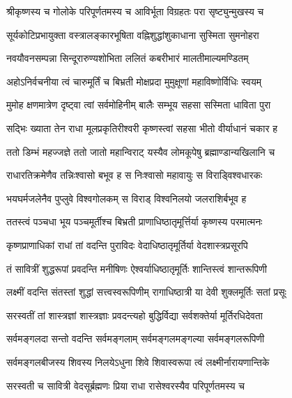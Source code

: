 

\twolineshloka
{श्रीकृष्णस्य च गोलोके परिपूर्णतमस्य च}
{आविर्भूता विग्रहतः परा सृष्ट्युन्मुखस्य च}

\twolineshloka
{सूर्यकोटिप्रभायुक्ता वस्त्रालङ्कारभूषिता}
{वह्निशुद्धांशुकाधाना सुस्मिता सुमनोहरा}

\twolineshloka
{नवयौवनसम्पन्ना सिन्दूरारुण्यशोभिता}
{ललितं कबरीभारं मालतीमाल्यमण्डितम्}

\twolineshloka
{अहोऽनिर्वचनीया त्वं चारुमूर्तिं च बिभ्रती}
{मोक्षप्रदा मुमुक्षूणां महाविष्णोर्विधिः स्वयम्}

\twolineshloka
{मुमोह क्षणमात्रेण दृष्ट्वा त्वां सर्वमोहिनीम्}
{बालैः सम्भूय सहसा सस्मिता धाविता पुरा}

\twolineshloka
{सद्भिः ख्याता तेन राधा मूलप्रकृतिरीश्वरी}
{कृष्णस्त्वां सहसा भीतो वीर्याधानं चकार ह}

\twolineshloka
{ततो डिम्भं महज्जज्ञे ततो जातो महान्विराट्}
{यस्यैव लोमकूपेषु ब्रह्माण्डान्यखिलानि च}

\twolineshloka
{राधारतिक्रमेणैव तन्निःश्वासो बभूव ह}
{स निःश्वासो महावायुः स विराड्\mbox{}विश्वधारकः}

\twolineshloka
{भयघर्मजलेनैव पुप्लुवे विश्वगोलकम्}
{स विराड् विश्वनिलयो जलराशिर्बभूव ह}

\twolineshloka
{ततस्त्वं पञ्चधा भूय पञ्चमूर्तीश्च बिभ्रती}
{प्राणाधिष्ठातृमूर्त्तिर्या कृष्णस्य परमात्मनः}

\twolineshloka
{कृष्णप्राणाधिकां राधां तां वदन्ति पुराविदः}
{वेदाधिष्ठातृमूर्तिर्या वेदशास्त्रप्रसूरपि}

\twolineshloka
{तं सावित्रीं शुद्धरूपां प्रवदन्ति मनीषिणः}
{ऐश्वर्याधिष्ठातृमूर्तिः शान्तिस्त्वं शान्तरूपिणी}

\twolineshloka
{लक्ष्मीं वदन्ति संतस्तां शुद्धां सत्त्‍‌वस्वरूपिणीम्}
{रागाधिष्ठात्री या देवी शुक्लमूर्तिः सतां प्रसूः}

\twolineshloka
{सरस्वतीं तां शास्त्रज्ञां शास्त्रज्ञाः प्रवदन्त्यहो}
{बुद्धिर्विद्या सर्वशक्तेर्या मूर्तिरधिदेवता}

\twolineshloka
{सर्वमङ्गलदा सन्तो वदन्ति सर्वमङ्गलाम्}
{सर्वमङ्गलमङ्गल्या सर्वमङ्गलरूपिणी}

\twolineshloka
{सर्वमङ्गलबीजस्य शिवस्य निलयेऽधुना}
{शिवे शिवास्वरूपा त्वं लक्ष्मीर्नारायणान्तिके}

\twolineshloka
{सरस्वती च सावित्री वेदसू‌र्ब्रह्मणः प्रिया}
{राधा रासेश्वरस्यैव परिपूर्णतमस्य च}

